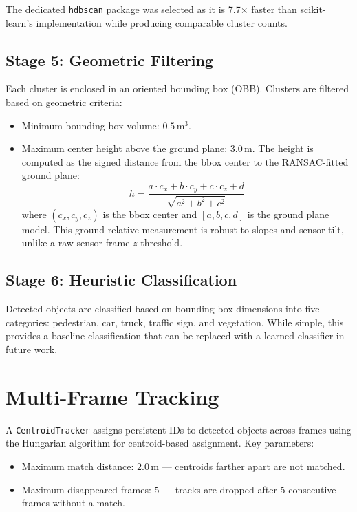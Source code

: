 \documentclass[a4paper, 12pt]{article}
\begin{document}
The dedicated \texttt{hdbscan} package was selected as it is 7.7$\times$ faster than scikit-learn's implementation while producing comparable cluster counts.

\subsection{Stage 5: Geometric Filtering}

Each cluster is enclosed in an oriented bounding box (OBB). Clusters are filtered based on geometric criteria:
\begin{itemize}[nosep]
    \item Minimum bounding box volume: $0.5$\,m$^3$.
    \item Maximum center height above the ground plane: $3.0$\,m. The height is computed as the signed distance from the bbox center to the RANSAC-fitted ground plane:
    \begin{equation}
        h = \frac{a \cdot c_x + b \cdot c_y + c \cdot c_z + d}{\sqrt{a^2 + b^2 + c^2}}
    \end{equation}
    where $(c_x, c_y, c_z)$ is the bbox center and $[a,b,c,d]$ is the ground plane model. This ground-relative measurement is robust to slopes and sensor tilt, unlike a raw sensor-frame $z$-threshold.
\end{itemize}

\subsection{Stage 6: Heuristic Classification}

Detected objects are classified based on bounding box dimensions into five categories: pedestrian, car, truck, traffic sign, and vegetation. While simple, this provides a baseline classification that can be replaced with a learned classifier in future work.

\section{Multi-Frame Tracking}

A \texttt{CentroidTracker} assigns persistent IDs to detected objects across frames using the Hungarian algorithm for centroid-based assignment. Key parameters:
\begin{itemize}[nosep]
    \item Maximum match distance: $2.0$\,m --- centroids farther apart are not matched.
    \item Maximum disappeared frames: $5$ --- tracks are dropped after 5 consecutive frames without a match.
\end{itemize}
\end{document}
